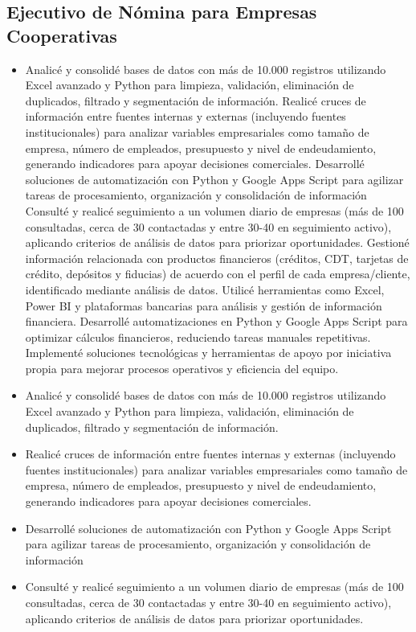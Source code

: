 \documentclass[10pt,a4paper]{article}
\begin{document}
\subsection*{Ejecutivo de Nómina para Empresas Cooperativas}
\begin{itemize}
\item Analicé y consolidé bases de datos con más de 
10.000 registros utilizando 
Excel avanzado y Python para limpieza, validación, eliminación de duplicados, filtrado y segmentación de información. Realicé cruces de información entre fuentes internas y externas (incluyendo fuentes institucionales) para analizar variables empresariales como tamaño de empresa, número de empleados, presupuesto y nivel de endeudamiento, generando indicadores para apoyar decisiones comerciales. Desarrollé soluciones de automatización con 
Python y Google Apps Script para agilizar tareas de procesamiento, organización y consolidación de información Consulté y realicé seguimiento a un volumen diario de empresas (más de 100 consultadas, cerca de 30 contactadas y entre 30-40 en seguimiento activo), aplicando criterios de análisis de datos para priorizar oportunidades. Gestioné información relacionada con productos financieros (créditos, CDT, tarjetas de crédito, depósitos y fiducias) de acuerdo con el perfil de cada empresa/cliente, identificado mediante análisis de datos. Utilicé herramientas como Excel, Power BI y plataformas bancarias para análisis y gestión de información financiera. Desarrollé automatizaciones en Python y Google Apps Script para optimizar cálculos financieros, reduciendo tareas manuales repetitivas. Implementé soluciones tecnológicas y herramientas de apoyo por iniciativa propia para mejorar procesos operativos y eficiencia del equipo.
\item Analicé y consolidé bases de datos con más de 
10.000 registros utilizando 
Excel avanzado y Python para limpieza, validación, eliminación de duplicados, filtrado y segmentación de información.
\item Realicé cruces de información entre fuentes internas y externas (incluyendo fuentes institucionales) para analizar variables empresariales como tamaño de empresa, número de empleados, presupuesto y nivel de endeudamiento, generando indicadores para apoyar decisiones comerciales.
\item Desarrollé soluciones de automatización con 
Python y Google Apps Script para agilizar tareas de procesamiento, organización y consolidación de información
\item Consulté y realicé seguimiento a un volumen diario de empresas (más de 100 consultadas, cerca de 30 contactadas y entre 30-40 en seguimiento activo), aplicando criterios de análisis de datos para priorizar oportunidades.

\end{itemize}
\end{document}
